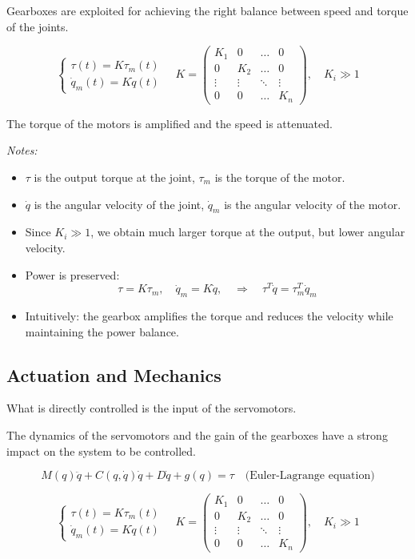 Gearboxes are exploited for achieving the right balance between speed and torque of the joints.  

\[
\begin{cases}
\tau(t) = K \tau_m(t) \\
\dot{q}_m(t) = K \dot{q}(t)
\end{cases}
\quad
K = 
\begin{pmatrix}
K_1 & 0   & \dots & 0 \\
0   & K_2 & \dots & 0 \\
\vdots & \vdots & \ddots & \vdots \\
0   & 0   & \dots & K_n
\end{pmatrix}, 
\quad K_i \gg 1
\]

The torque of the motors is amplified and the speed is attenuated.  

\textit{Notes:}  
\begin{itemize}
    \item $\tau$ is the output torque at the joint, $\tau_m$ is the torque of the motor.  
    \item $\dot{q}$ is the angular velocity of the joint, $\dot{q}_m$ is the angular velocity of the motor.  
    \item Since $K_i \gg 1$, we obtain much larger torque at the output, but lower angular velocity.  
    \item Power is preserved:  
    \[
    \tau = K \tau_m, \quad \dot{q}_m = K \dot{q}, \quad \Rightarrow \quad \tau^T \dot{q} = \tau_m^T \dot{q}_m
    \]  
    \item Intuitively: the gearbox amplifies the torque and reduces the velocity while maintaining the power balance.  
\end{itemize}

\hfill

\subsection{Actuation and Mechanics}

What is directly controlled is the input of the servomotors.  

The dynamics of the servomotors and the gain of the gearboxes have a strong impact on the system to be controlled.  

\[
M(q)\ddot{q} + C(q,\dot{q})\dot{q} + D\dot{q} + g(q) = \tau
\quad \text{(Euler-Lagrange equation)}
\]

\[
\begin{cases}
\tau(t) = K \tau_m(t) \\
\dot{q}_m(t) = K \dot{q}(t)
\end{cases}
\quad
K = 
\begin{pmatrix}
K_1 & 0   & \dots & 0 \\
0   & K_2 & \dots & 0 \\
\vdots & \vdots & \ddots & \vdots \\
0   & 0   & \dots & K_n
\end{pmatrix}, 
\quad K_i \gg 1
\]

